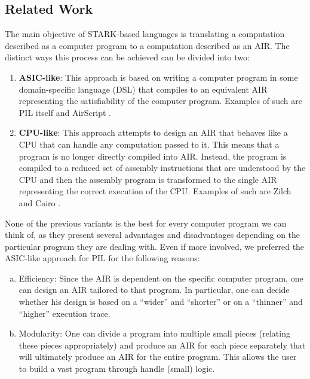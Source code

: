 \subsection{Related Work}

The main objective of STARK-based languages is translating a computation described as a computer program to a computation described as an AIR. The distinct ways this process can be achieved can be divided into two:
\begin{enumerate}
    \item \textbf{ASIC-like}: This approach is based on writing a computer program in some domain-specific language (DSL) that compiles to an equivalent AIR representing the satisfiability of the computer program. Examples of such are PIL itself and AirScript \cite{AirScript}.
    \item \textbf{CPU-like}: This approach attempts to design an AIR that behaves like a CPU that can handle any computation passed to it. This means that a program is no longer directly compiled into AIR. Instead, the program is compiled to a reduced set of assembly instructions that are understood by the CPU and then the assembly program is transformed to the single AIR representing the correct execution of the CPU. Examples of such are Zilch \cite{EPRINT:MouTso20} and Cairo \cite{EPRINT:GolPapRia21}.
\end{enumerate}

None of the previous variants is the best for every computer program we can think of, as they present several advantages and disadvantages depending on the particular program they are dealing with. Even if more involved, we preferred the ASIC-like approach for PIL for the following reasons:
\begin{enumerate}[a)]
    \item Efficiency: Since the AIR is dependent on the specific computer program, one can design an AIR tailored to that program. In particular, one can decide whether his design is based on a ``wider'' and ``shorter'' or on a ``thinner'' and ``higher'' execution trace.
    \item Modularity: One can divide a program into multiple small pieces (relating these pieces appropriately) and produce an AIR for each piece separately that will ultimately produce an AIR for the entire program. This allows the user to build a vast program through handle (small) logic. 
\end{enumerate}

